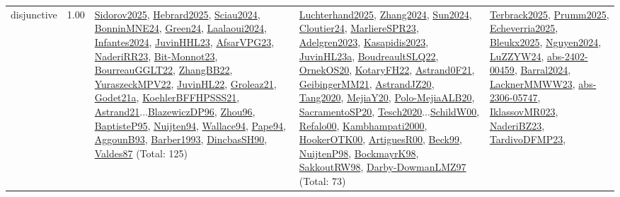 {\begin{longtable}{p{3cm}r>{\raggedright\arraybackslash}p{6cm}>{\raggedright\arraybackslash}p{6cm}>{\raggedright\arraybackslash}p{8cm}}
\index{disjunctive}\index{Constraints!disjunctive}disjunctive &  1.00 & \hyperref[detail:Sidorov2025]{Sidorov2025}, \hyperref[detail:Hebrard2025]{Hebrard2025}, \hyperref[detail:Sciau2024]{Sciau2024}, \hyperref[detail:BonninMNE24]{BonninMNE24}, \hyperref[detail:Green24]{Green24}, \hyperref[detail:Laalaoui2024]{Laalaoui2024}, \hyperref[detail:Infantes2024]{Infantes2024}, \hyperref[detail:JuvinHHL23]{JuvinHHL23}, \hyperref[detail:AfsarVPG23]{AfsarVPG23}, \hyperref[detail:NaderiRR23]{NaderiRR23}, \hyperref[detail:Bit-Monnot23]{Bit-Monnot23}, \hyperref[detail:BourreauGGLT22]{BourreauGGLT22}, \hyperref[detail:ZhangBB22]{ZhangBB22}, \hyperref[detail:YuraszeckMPV22]{YuraszeckMPV22}, \hyperref[detail:JuvinHL22]{JuvinHL22}, \hyperref[detail:Groleaz21]{Groleaz21}, \hyperref[detail:Godet21a]{Godet21a}, \hyperref[detail:KoehlerBFFHPSSS21]{KoehlerBFFHPSSS21}, \hyperref[detail:Astrand21]{Astrand21}...\hyperref[detail:BlazewiczDP96]{BlazewiczDP96}, \hyperref[detail:Zhou96]{Zhou96}, \hyperref[detail:BaptisteP95]{BaptisteP95}, \hyperref[detail:Nuijten94]{Nuijten94}, \hyperref[detail:Wallace94]{Wallace94}, \hyperref[detail:Pape94]{Pape94}, \hyperref[detail:AggounB93]{AggounB93}, \hyperref[detail:Barber1993]{Barber1993}, \hyperref[detail:DincbasSH90]{DincbasSH90}, \hyperref[detail:Valdes87]{Valdes87} (Total: 125) & \hyperref[detail:Luchterhand2025]{Luchterhand2025}, \hyperref[detail:Zhang2024]{Zhang2024}, \hyperref[detail:Sun2024]{Sun2024}, \hyperref[detail:Cloutier24]{Cloutier24}, \hyperref[detail:MarliereSPR23]{MarliereSPR23}, \hyperref[detail:Adelgren2023]{Adelgren2023}, \hyperref[detail:Kasapidis2023]{Kasapidis2023}, \hyperref[detail:JuvinHL23a]{JuvinHL23a}, \hyperref[detail:BoudreaultSLQ22]{BoudreaultSLQ22}, \hyperref[detail:OrnekOS20]{OrnekOS20}, \hyperref[detail:KotaryFH22]{KotaryFH22}, \hyperref[detail:Astrand0F21]{Astrand0F21}, \hyperref[detail:GeibingerMM21]{GeibingerMM21}, \hyperref[detail:AstrandJZ20]{AstrandJZ20}, \hyperref[detail:Tang2020]{Tang2020}, \hyperref[detail:MejiaY20]{MejiaY20}, \hyperref[detail:Polo-MejiaALB20]{Polo-MejiaALB20}, \hyperref[detail:SacramentoSP20]{SacramentoSP20}, \hyperref[detail:Tesch2020]{Tesch2020}...\hyperref[detail:SchildW00]{SchildW00}, \hyperref[detail:Refalo00]{Refalo00}, \hyperref[detail:Kambhampati2000]{Kambhampati2000}, \hyperref[detail:HookerOTK00]{HookerOTK00}, \hyperref[detail:ArtiguesR00]{ArtiguesR00}, \hyperref[detail:Beck99]{Beck99}, \hyperref[detail:NuijtenP98]{NuijtenP98}, \hyperref[detail:BockmayrK98]{BockmayrK98}, \hyperref[detail:SakkoutRW98]{SakkoutRW98}, \hyperref[detail:Darby-DowmanLMZ97]{Darby-DowmanLMZ97} (Total: 73) & \hyperref[detail:Terbrack2025]{Terbrack2025}, \hyperref[detail:Prumm2025]{Prumm2025}, \hyperref[detail:Echeverria2025]{Echeverria2025}, \hyperref[detail:Bleukx2025]{Bleukx2025}, \hyperref[detail:Nguyen2024]{Nguyen2024}, \hyperref[detail:LuZZYW24]{LuZZYW24}, \hyperref[detail:abs-2402-00459]{abs-2402-00459}, \hyperref[detail:Barral2024]{Barral2024}, \hyperref[detail:LacknerMMWW23]{LacknerMMWW23}, \hyperref[detail:abs-2306-05747]{abs-2306-05747}, \hyperref[detail:IklassovMR023]{IklassovMR023}, \hyperref[detail:NaderiBZ23]{NaderiBZ23}, \hyperref[detail:TardivoDFMP23]{TardivoDFMP23}, 
\end{longtable}}
